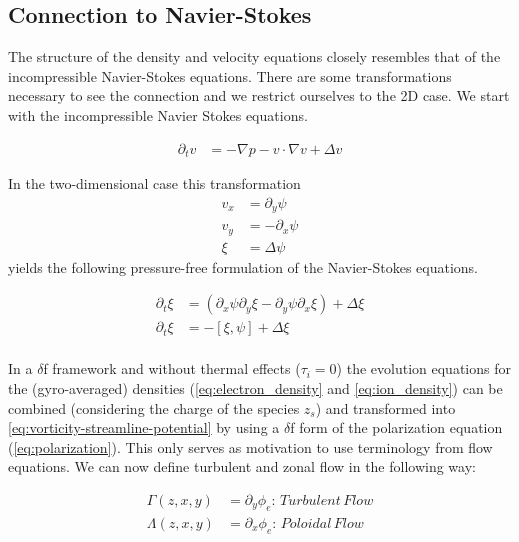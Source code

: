\documentclass[master.tex]{subfiles}
\begin{document}
\subsection{Connection to Navier-Stokes}
\label{sec:connection_navier_stokes}

The structure of the density and velocity equations closely resembles that of the incompressible Navier-Stokes equations.
There are some transformations necessary to see the connection and we restrict ourselves to the 2D case. We start with the incompressible Navier Stokes equations.

\begin{align}
    \partial_t v &= - \nabla p - v \cdot \nabla v + \Delta v
\end{align}

In the two-dimensional case this transformation
\begin{align}
    v_x &= \partial_y \psi \\
    v_y &= -\partial_x \psi \\
    \xi &= \Delta \psi
\end{align}
yields the following pressure-free formulation of the Navier-Stokes equations.

\begin{align}
    \partial_t \xi &= \left( \partial_x \psi \partial_y \xi - \partial_y \psi \partial_x \xi  \right) + \Delta \xi\\
    \partial_t \xi &= - \left[\xi, \psi\right] + \Delta \xi \label{eq:vorticity-streamline-potential} \\
\end{align}

In a $\delta$f framework and without thermal effects ($\tau_i = 0$) the evolution equations for the (gyro-averaged) densities (\autoref{eq:electron_density} and \autoref{eq:ion_density}) can be combined (considering the charge of the species $z_s$) and transformed into  \autoref{eq:vorticity-streamline-potential} by using a $\delta$f form of the polarization equation (\autoref{eq:polarization}).\newline
This only serves as motivation to use terminology from flow equations. We can now define turbulent and zonal flow in the following way:

\begin{align}
    \Gamma(z,x,y) &= \partial_y \phi_e :\, Turbulent\,Flow\\
    \Lambda(z,x,y) &= \partial_x \phi_e :\, Poloidal\,Flow
\end{align}
\end{document}
